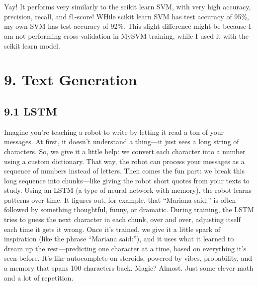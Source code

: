 \documentclass[11pt]{article}
\begin{document}
    \begin{center}
    \end{center}
    { \hspace*{\fill} \\}
    
    \begin{center}
    \end{center}
    { \hspace*{\fill} \\}
    
    Yay! It performs very similarly to the scikit learn SVM, with very high
accuracy, precision, recall, and f1-score! WHile scikit learn SVM has
test accuracy of 95\%, my own SVM has test accuracy of 92\%. This slight
difference might be because I am not performing cross-validation in
MySVM training, while I used it with the scikit learn model.

    \section{9. Text Generation}\label{text-generation}

\subsection{9.1 LSTM}\label{lstm}

Imagine you're teaching a robot to write by letting it read a ton of
your messages. At first, it doesn't understand a thing---it just sees a
long string of characters. So, we give it a little help: we convert each
character into a number using a custom dictionary. That way, the robot
can process your messages as a sequence of numbers instead of letters.
Then comes the fun part: we break this long sequence into chunks---like
giving the robot short quotes from your texts to study. Using an LSTM (a
type of neural network with memory), the robot learns patterns over
time. It figures out, for example, that ``Mariana said:'' is often
followed by something thoughtful, funny, or dramatic. During training,
the LSTM tries to guess the next character in each chunk, over and over,
adjusting itself each time it gets it wrong. Once it's trained, we give
it a little spark of inspiration (like the phrase ``Mariana said:''),
and it uses what it learned to dream up the rest---predicting one
character at a time, based on everything it's seen before. It's like
autocomplete on steroids, powered by vibes, probability, and a memory
that spans 100 characters back. Magic? Almost. Just some clever math and
a lot of repetition.
\end{document}
